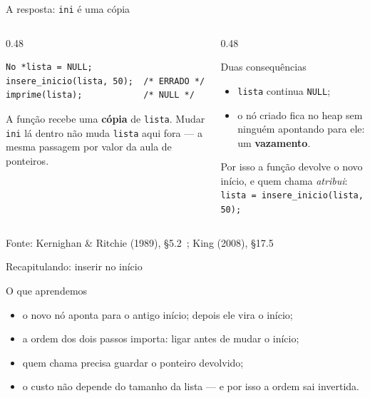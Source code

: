 \documentclass[aspectratio=169]{beamer}
\newcommand{\fonte}[1]{\vfill\hfill{\scriptsize\textcolor{UFSGray}{Fonte: #1}}}
\begin{document}
\begin{frame}[fragile]{A resposta: \texttt{ini} é uma cópia}
  \begin{columns}[T]
    \begin{column}{0.48\textwidth}
\begin{lstlisting}[style=tinyC]
No *lista = NULL;
insere_inicio(lista, 50);  /* ERRADO */
imprime(lista);            /* NULL */
\end{lstlisting}
      \small A função recebe uma \textbf{cópia} de \texttt{lista}. Mudar
      \texttt{ini} lá dentro não muda \texttt{lista} aqui fora --- a mesma
      passagem por valor da aula de ponteiros.
    \end{column}
    \begin{column}{0.48\textwidth}
      \begin{block}{Duas consequências}
        \small
        \begin{itemize}
          \item \texttt{lista} continua \texttt{NULL};
          \item o nó criado fica no heap sem ninguém apontando para ele:
            um \textbf{vazamento}.
        \end{itemize}
      \end{block}
      \small Por isso a função devolve o novo início, e quem chama
      \emph{atribui}: \texttt{lista = insere\_inicio(lista, 50);}
    \end{column}
  \end{columns}
  \fonte{Kernighan \& Ritchie (1989), §5.2~\cite{kernighan1989c};
    King (2008), §17.5~\cite{king2008c}}
\end{frame}

\begin{frame}{Recapitulando: inserir no início}
  \begin{block}{O que aprendemos}
    \begin{itemize}
      \item o novo nó aponta para o antigo início; depois ele vira o início;
      \item a ordem dos dois passos importa: ligar antes de mudar o início;
      \item quem chama precisa guardar o ponteiro devolvido;
      \item o custo não depende do tamanho da lista --- e por isso a ordem
        sai invertida.
    \end{itemize}
  \end{block}
\end{frame}
\end{document}
